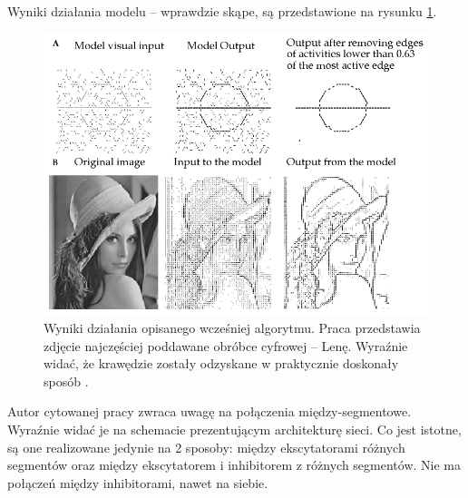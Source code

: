 Wyniki działania modelu -- wprawdzie skąpe, są przedstawione na rysunku \ref{fig:li_out}.\\

\begin{figure}[ht]
	\centering
	\includegraphics[width=1.00\textwidth]{images/li_out.png}
	\caption{Wyniki działania opisanego wcześniej algorytmu. Praca przedstawia zdjęcie najczęściej poddawane obróbce cyfrowej -- Lenę. Wyraźnie widać, że krawędzie zostały odzyskane w praktycznie doskonały sposób \cite{Li1998}.}
	\label{fig:li_out}
\end{figure}

Autor cytowanej pracy zwraca uwagę na połączenia między-segmentowe. Wyraźnie widać je na schemacie prezentującym architekturę sieci. Co jest istotne, są one realizowane jedynie na 2 sposoby: między ekscytatorami różnych segmentów oraz między ekscytatorem i inhibitorem z różnych segmentów. Nie ma połączeń między inhibitorami, nawet na siebie.\\

